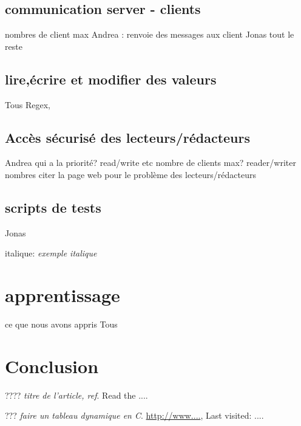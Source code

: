 \documentclass[12pt,a4paper]{article}
\begin{document}
\subsection{communication server - clients}
nombres de client max
Andrea : renvoie des messages aux client
Jonas tout le reste
\subsection{lire,écrire et modifier des valeurs}
Tous
Regex,
\subsection{Accès sécurisé des lecteurs/rédacteurs}
Andrea
qui a la priorité? read/write etc
nombre de clients max? reader/writer nombres
citer la page web pour le problème des lecteurs/rédacteurs
\subsection{scripts de tests}
Jonas

italique: \textit{exemple italique}

\section{apprentissage}
ce que nous avons appris
Tous

\section{Conclusion}



\begin{thebibliography}{20}

????			%
\textit{titre de l'article, ref}.	%
Read the ....										%

???			%
\textit{faire un tableau dynamique en C}.					    %
\url{http://www....},	%
Last visited: ....								%
\end{thebibliography}
\end{document}
